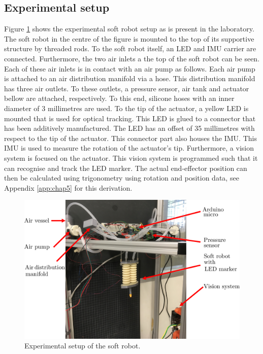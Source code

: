 \subsection*{Experimental setup}

Figure \ref{fig5:setup} shows the experimental soft robot setup as is present in the laboratory. The soft robot in the centre of the figure is mounted to the top of its supportive structure by threaded rods. To the soft robot itself, an LED and IMU carrier are connected. Furthermore, the two air inlets a the top of the soft robot can be seen. Each of these air inlets is in contact with an air pump as follows. Each air pump is attached to an air distribution manifold via a hose. This distribution manifold has three air outlets. To these outlets, a pressure sensor, air tank and actuator bellow are attached, respectively. To this end, silicone hoses with an inner diameter of 3 millimetres are used. To the tip of the actuator, a yellow LED is mounted that is used for optical tracking. This LED is glued to a connector that has been additively manufactured. The LED has an offset of 35 millimetres with respect to the tip of the actuator. This connector part also houses the IMU. This IMU is used to measure the rotation of the actuator's tip. Furthermore, a vision system is focused on the actuator. This vision system is programmed such that it can recognise and track the LED marker. The actual end-effector position can then be calculated using trigonometry using rotation and position data, see Appendix \ref{app:chap5} for this derivation.


\begin{figure}[H]
    \centering
    \includegraphics[width = \textwidth]{Figures/Chapter5/expsetup.png}
    \caption{Experimental setup of the soft robot.}
    \label{fig5:setup}
\end{figure}


